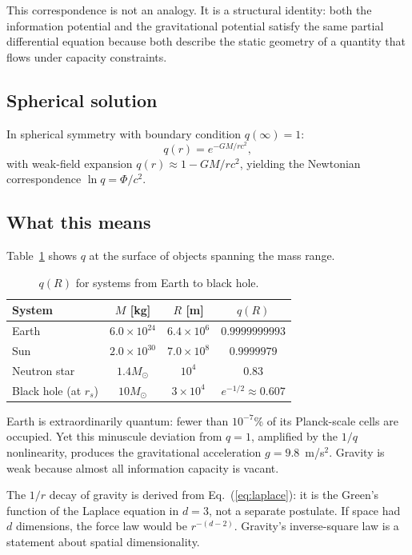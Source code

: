 \documentclass[12pt]{article}
\begin{document}
This correspondence is not an analogy. It is a structural identity: both the information potential and the gravitational potential satisfy the same partial differential equation because both describe the static geometry of a quantity that flows under capacity constraints.

\subsection{Spherical solution}

In spherical symmetry with boundary condition $q(\infty)=1$:
\begin{equation}
\boxed{q(r) = e^{-GM/rc^2}},
\label{eq:spherical}
\end{equation}
with weak-field expansion $q(r)\approx 1 - GM/rc^2$, yielding the Newtonian correspondence $\ln q = \Phi/c^2$.

\subsection{What this means}

Table~\ref{tab:scales} shows $q$ at the surface of objects spanning the mass range.

\begin{table}[h]
\caption{$q(R)$ for systems from Earth to black hole.}
\label{tab:scales}
\begin{tabular}{lccc}
\toprule
System & $M$ [kg] & $R$ [m] & $q(R)$ \\
\midrule
Earth & $6.0\times10^{24}$ & $6.4\times10^6$ & $0.9999999993$ \\
Sun & $2.0\times10^{30}$ & $7.0\times10^8$ & $0.9999979$ \\
Neutron star & $1.4M_\odot$ & $10^4$ & $0.83$ \\
Black hole (at $r_s$) & $10M_\odot$ & $3\times10^4$ & $e^{-1/2}\approx 0.607$ \\
\bottomrule
\end{tabular}
\end{table}

Earth is extraordinarily quantum: fewer than $10^{-7}$\% of its Planck-scale cells are occupied. Yet this minuscule deviation from $q=1$, amplified by the $1/q$ nonlinearity, produces the gravitational acceleration $g=9.8$~m/s$^2$. Gravity is weak because almost all information capacity is vacant.

The $1/r$ decay of gravity is derived from Eq.~(\ref{eq:laplace}): it is the Green's function of the Laplace equation in $d=3$, not a separate postulate. If space had $d$ dimensions, the force law would be $r^{-(d-2)}$. Gravity's inverse-square law is a statement about spatial dimensionality.
\end{document}

